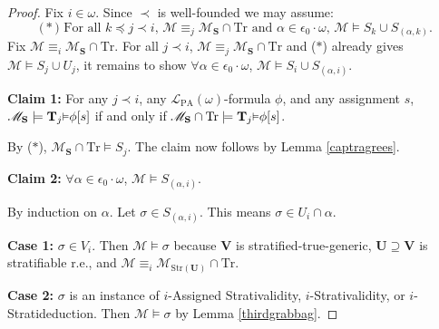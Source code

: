 \documentclass[reqno]{article}
\theoremstyle{definition}
\def\L{\mathscr{L}}
\def\M{\mathscr{M}}
\def\T{\mathbf{T}}
\def\S{\mathbf{S}}
\def\U{\mathbf{U}}
\def\V{\mathbf{V}}
\def\LPA{\L_{\mathrm{PA}}}
\def\epom{\epsilon_0\cdot\omega}
\def\Tr{\mathrm{Tr}}
\def\ctr{\cap\Tr}
\def\myequiv{\equiv}
\renewcommand{\Pr}[1]{\T_{#1}\mbox{\small${\vDash}$}}
\newcommand{\case}[1]{\textbf{Case #1:}}
\newcommand{\claim}[1]{\textbf{Claim #1:}}
\newcommand{\str}[1]{\mathrm{Str}(#1)} \newcommand{\Str}[1]{\str{#1}}
\begin{document}
\begin{proof}
Fix $i\in\omega$.  Since $\prec$ is well-founded we may assume:
\[
\mbox{($*$) For all $k\preceq j\prec i$, $\M\myequiv_j\M_\S\ctr$ and $\alpha\in\epom$, $\M\models S_k\cup S_{(\alpha,k)}$.}
\]
Fix $\M\myequiv_i\M_\S\ctr$.  For all $j\prec i$, $\M\myequiv_j\M_\S\ctr$ and ($*$) already gives $\M\models S_j\cup U_j$,
it remains to show $\forall \alpha\in\epom$, $\M\models S_i\cup S_{(\alpha,i)}$.

\item
\claim1
For any $j\prec i$, any $\LPA(\omega)$-formula $\phi$, and any assignment $s$,
$\M_\S\models\Pr j\phi[s]$ if and only if $\M_\S\ctr\models\Pr j\phi[s]$.

\item
By ($*$), $\M_\S\ctr\models S_j$.
The claim now follows by Lemma \ref{captragrees}.

\item
\claim2
$\forall \alpha\in\epom$, $\M\models S_{(\alpha,i)}$.

\item
By induction on $\alpha$.  Let $\sigma\in S_{(\alpha,i)}$.  This means $\sigma\in U_i\cap\alpha$.

\item\case1
$\sigma\in V_i$.  Then $\M\models \sigma$ because $\V$ is stratified-true-generic, $\U\supseteq\V$
is stratifiable r.e., and $\M\myequiv_i\M_{\str\U}\ctr$.

\item\case2
$\sigma$ is an instance of $i$-Assigned Strativalidity, $i$-Strativalidity, or $i$-Stratideduction.
Then $\M\models\sigma$ by Lemma \ref{thirdgrabbag}.


\end{proof}
\end{document}
